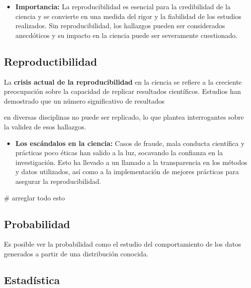 \documentclass[
  letterpaper,
  DIV=11,
  numbers=noendperiod]{scrreprt}
\newenvironment{Shaded}{\begin{snugshade}}{\end{snugshade}}
\newcommand{\CommentTok}[1]{\textcolor[rgb]{0.37,0.37,0.37}{#1}}
\providecommand{\tightlist}{%
  \setlength{\itemsep}{0pt}\setlength{\parskip}{0pt}}\usepackage{longtable,booktabs,array}
\begin{document}
\begin{itemize}
\tightlist
\item
  \textbf{Importancia:} La reproducibilidad es esencial para la
  credibilidad de la ciencia y se convierte en una medida del rigor y la
  fiabilidad de los estudios realizados. Sin reproducibilidad, los
  hallazgos pueden ser considerados anecdóticos y su impacto en la
  ciencia puede ser severamente cuestionado.
\end{itemize}

\subsection{Reproductibilidad}\label{reproductibilidad}

La \textbf{crisis actual de la reproducibilidad} en la ciencia se
refiere a la creciente preocupación sobre la capacidad de replicar
resultados científicos. Estudios han demostrado que un número
significativo de resultados

en diversas disciplinas no puede ser replicado, lo que plantea
interrogantes sobre la validez de esos hallazgos.

\begin{itemize}
\tightlist
\item
  \textbf{Los escándalos en la ciencia:} Casos de fraude, mala conducta
  científica y prácticas poco éticas han salido a la luz, socavando la
  confianza en la investigación. Esto ha llevado a un llamado a la
  transparencia en los métodos y datos utilizados, así como a la
  implementación de mejores prácticas para asegurar la reproducibilidad.
\end{itemize}

\begin{Shaded}
\begin{Highlighting}[]
\CommentTok{\# arreglar todo esto}
\end{Highlighting}
\end{Shaded}

\subsection{Probabilidad}\label{probabilidad}

Es posible ver la probabilidad como el estudio del comportamiento de los
datos generados a partir de una distribución conocida.

\subsection{Estadística}\label{estaduxedstica}
\end{document}
